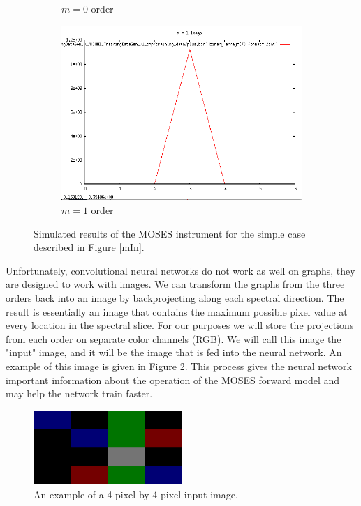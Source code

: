\documentclass[twoside]{article}
\begin{document}
\begin{figure}
\begin{subfigure}[b]{0.3\textwidth}
          \caption{$m = 0$ order }
      \end{subfigure}
        \begin{subfigure}[b]{0.3\textwidth}
            \includegraphics[width=\textwidth]{images/m1}
            \caption{$m = 1$ order }
        \end{subfigure}
 
     \caption{Simulated results of the MOSES instrument for the simple case described in Figure \ref{mIn}.}
     \label{m1-1}
 \end{figure}
 
 Unfortunately, convolutional neural networks do not work as well on graphs, they are designed to work with images. We can transform the graphs from the three orders back into an image by backprojecting along each spectral direction. The result is essentially an image that contains the maximum possible pixel value at every location in the spectral slice. For our purposes we will store the projections from each order on separate color channels (RGB). We will call this image the "input" image, and it will be the image that is fed into the neural network. An example of this image is given in Figure \ref{mOut}. This process gives the neural network important information about the operation of the MOSES forward model and may help the network train faster. 
 
  \begin{figure}[H]
    
    \centering
      \includegraphics[width=0.5\textwidth]{images/mOut}
      \caption{An example of a 4 pixel by 4 pixel input image.}
      \label{mOut}
  \end{figure}
 
\end{document}
